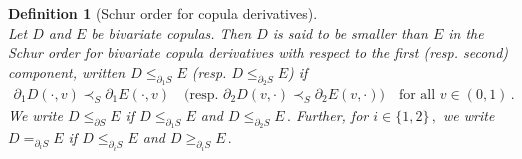 \documentclass{article}
\newtheorem{definition}[theorem]{Definition}
\begin{document}
\begin{definition}[Schur order for copula derivatives]
    \label{defschurcopder}~\\
    Let \(D\) and \(E\) be bivariate copulas.
    Then \(D\) is said to be smaller than \(E\) in the \emph{Schur order for bivariate copula derivatives} with respect to the first (resp. second) component, written  \(D\leq_{\partial_1 S} E\) (resp. \(D\leq_{\partial_2 S}E\)) if
    \begin{align*}
        \partial_1 D(\cdot,v)\prec_S \partial_1 E(\cdot,v) \quad \text{(resp. } \partial_2 D(v,\cdot) \prec_S \partial_2 E(v,\cdot)\text{)} \quad \text{for all } v\in (0,1) \,.
    \end{align*}
    We write \(D\leq_{\partial S} E\) if \(D\leq_{\partial_1 S} E\) and \(D\leq_{\partial_2 S} E\,.\)
    Further, for \(i\in \{1,2\}\,,\) we write \(D=_{\partial_i S} E\) if \(D\leq_{\partial_i S} E\) and \(D\geq_{\partial_i S} E\,.\)
\end{definition}
\end{document}
